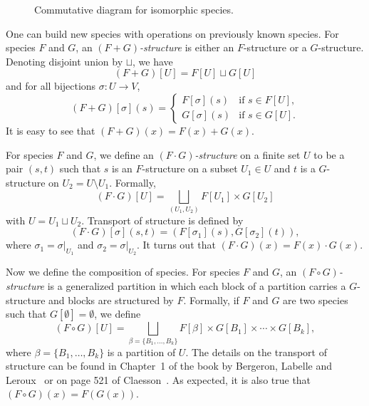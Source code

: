 \documentclass[a4paper, 11pt]{article}
\theoremstyle{definition}
\begin{document}
\begin{figure}
  \centering
  \caption{Commutative diagram for isomorphic species.}
  \label{fig: isomorphic as species diagram} 
\end{figure}

One can build new species with operations on previously known
species. For species
$F$ and $G$, an \emph{$(F+G)$-structure} is either an $F$-structure or
a $G$-structure. Denoting disjoint union by $\sqcup$, we have
\[
  (F+G)[U]=F[U] \sqcup G[U]
\]
and for all bijections $\sigma: U \to V$,
\begin{equation*}
  (F+G)[\sigma](s) = 
  \begin{cases}
    F[\sigma](s) &  \text{if }s \in F[U], \\
    G[\sigma](s) &  \text{if }s \in G[U].
  \end{cases}
\end{equation*}
It is easy to see that $(F+G)(x)=F(x)+G(x)$.
 
For species $F$ and $G$, we define an \emph{$(F \cdot G)$-structure} on a
finite set $U$ to be a pair $(s,t)$ such that $s$ is an $F$-structure on a
subset $U_1 \in U$ and $t$ is a $G$-structure on
$U_2 = U \setminus U_1$. Formally,
\[(F \cdot G)[U] = \bigsqcup_{(U_1,U_2)} F[U_1] \times G[U_2]\] with
$U=U_1 \sqcup U_2$.
Transport of structure is defined by
\[(F \cdot G)[\sigma](s,t) = (F[\sigma_1](s), G[\sigma_2](t)),\] where
$\sigma_1 = \sigma |_{U_1}$ and $\sigma_2 = \sigma |_{U_2}$. It turns out
that $(F \cdot G)(x) = F(x) \cdot G(x)$.

Now we define the composition of species. For species $F$ and $G$, 
an
\emph{$(F \circ G)$-structure} is a generalized partition in which each
block of a partition carries a $G$-structure and blocks are structured
by $F$. Formally, if $F$ and $G$ are two species such that
$G[\emptyset] = \emptyset$, we define
\[\displaystyle (F \circ G)[U] =
  \bigsqcup_{\beta=\{B_1,\ldots, B_k\}}
  F[\beta] \times G[B_1] \times \cdots \times G[B_k],
\]
where $\beta=\{B_1,\ldots, B_k\}$ is a partition of $U$. The
details on the transport of structure can be found in Chapter~1
of the book by Bergeron, Labelle and Leroux~\cite{holybook} or on
page 521 of Claesson~\cite{12foldway}.
As expected, it is also true that $(F \circ G)(x) = F(G(x))$.
\end{document}
